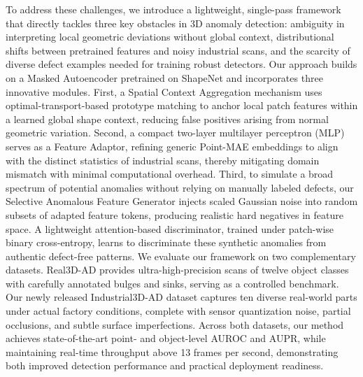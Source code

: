 To address these challenges, we introduce a lightweight, single-pass framework that directly tackles three key obstacles in 3D anomaly detection: ambiguity in interpreting local geometric deviations without global context, distributional shifts between pretrained features and noisy industrial scans, and the scarcity of diverse defect examples needed for training robust detectors. Our approach builds on a Masked Autoencoder pretrained on ShapeNet and incorporates three innovative modules. First, a Spatial Context Aggregation mechanism uses optimal-transport-based prototype matching to anchor local patch features within a learned global shape context, reducing false positives arising from normal geometric variation. Second, a compact two-layer multilayer perceptron (MLP) serves as a Feature Adaptor, refining generic Point-MAE embeddings to align with the distinct statistics of industrial scans, thereby mitigating domain mismatch with minimal computational overhead. Third, to simulate a broad spectrum of potential anomalies without relying on manually labeled defects, our Selective Anomalous Feature Generator injects scaled Gaussian noise into random subsets of adapted feature tokens, producing realistic hard negatives in feature space. A lightweight attention-based discriminator, trained under patch-wise binary cross-entropy, learns to discriminate these synthetic anomalies from authentic defect-free patterns. We evaluate our framework on two complementary datasets. Real3D-AD \cite{liu2023real3d} provides ultra-high-precision scans of twelve object classes with carefully annotated bulges and sinks, serving as a controlled benchmark. Our newly released Industrial3D-AD dataset captures ten diverse real-world parts under actual factory conditions, complete with sensor quantization noise, partial occlusions, and subtle surface imperfections. Across both datasets, our method achieves state-of-the-art point- and object-level AUROC and AUPR, while maintaining real-time throughput above 13 frames per second, demonstrating both improved detection performance and practical deployment readiness.

